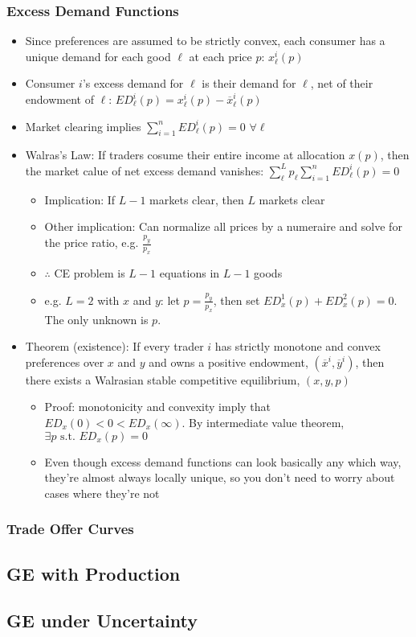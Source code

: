 \documentclass{article}
\newcommand{\olx}{\overline{x}}
\newcommand{\oly}{\overline{y}}
\newcommand{\blue}[1]{{\color{blue}#1}}
\newcommand{\sumn}{\sum_{i=1}^n}
\begin{document}
\subsubsection{Excess Demand Functions}
\begin{itemize}
	\item Since preferences are assumed to be strictly convex, each consumer has a unique demand for each good $\ell$ at each price $p$: $x_\ell^i(p)$
	\item Consumer $i$'s \blue{excess demand} for $\ell$ is their demand for $\ell$, net of their endowment of $\ell$: ${ED^i_\ell(p)=x_\ell^i(p)-\olx_\ell^i(p)}$
	\item Market clearing implies $\sumn ED_\ell^i(p)=0$ $\forall \ell$
	\item \blue{Walras's Law:} If traders cosume their entire income at allocation $x(p)$, then the market calue of net excess demand vanishes: ${\sum_\ell^Lp_\ell \sumn ED^i_\ell(p)=0}$
		\begin{itemize}
			\item Implication: If $L-1$ markets clear, then $L$ markets clear
			\item Other implication: Can normalize all prices by a numeraire and solve for the price ratio, e.g. $\frac{p_y}{p_x}$
			\item $\therefore$ CE problem is $L-1$ equations in $L-1$ goods
			\item e.g. $L=2$ with $x$ and $y$: let $p=\frac{p_y}{p_x}$, then set ${ED^1_x(p) + ED^2_x(p) = 0}$. The only unknown is $p$.
		\end{itemize}
	\item \blue{Theorem (existence):} If every trader $i$ has strictly monotone and convex preferences over $x$ and $y$ and owns a positive endowment, $(\olx^i,\oly^i)$, then there exists a Walrasian stable competitive equilibrium, $(x,y,p)$
		\begin{itemize}
			\item Proof: monotonicity and convexity imply that ${ED_x(0)<0<ED_x(\infty)}$. By intermediate value theorem, ${\exists p\text{ s.t. }ED_x(p)=0}$
			\item Even though excess demand functions can look basically any which way, they're almost always locally unique, so you don't need to worry about cases where they're not
		\end{itemize}
\end{itemize}

\subsubsection{Trade Offer Curves}


\subsection{GE with Production}



\subsection{GE under Uncertainty}


\end{document}
